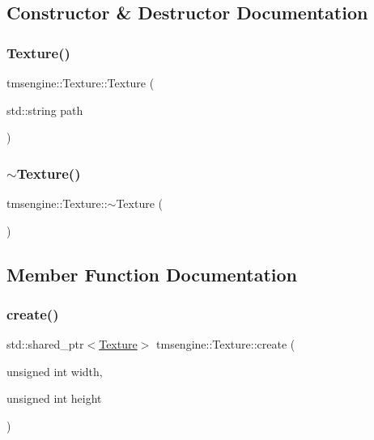 \subsection{Constructor \& Destructor Documentation}
\mbox{\label{classtmsengine_1_1_texture_a73f0e6bf5515ee744e3b04ff1899297f}} 
\subsubsection{\texorpdfstring{Texture()}{Texture()}}
{\footnotesize\ttfamily tmsengine\+::\+Texture\+::\+Texture (\begin{DoxyParamCaption}\item[{std\+::string}]{path }\end{DoxyParamCaption})}

\mbox{\label{classtmsengine_1_1_texture_a3985bc791d34dd2c9f3aad02b8095a97}} 
\subsubsection{\texorpdfstring{$\sim$\+Texture()}{~Texture()}}
{\footnotesize\ttfamily tmsengine\+::\+Texture\+::$\sim$\+Texture (\begin{DoxyParamCaption}{ }\end{DoxyParamCaption})}



\subsection{Member Function Documentation}
\mbox{\label{classtmsengine_1_1_texture_a34e2d3a96afc3f1882f32b7ed93497c0}} 
\subsubsection{\texorpdfstring{create()}{create()}}
{\footnotesize\ttfamily std\+::shared\+\_\+ptr$<$\hyperlink{classtmsengine_1_1_texture}{Texture}$>$ tmsengine\+::\+Texture\+::create (\begin{DoxyParamCaption}\item[{unsigned int}]{width,  }\item[{unsigned int}]{height }\end{DoxyParamCaption})\hspace{0.3cm}{\ttfamily [private]}}

